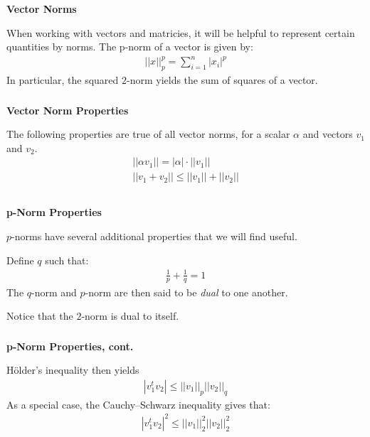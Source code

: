 \begin{frame}[fragile] \frametitle{}

{\bf Vector Norms}

When working with vectors and matricies, it will be helpful
to represent certain quantities by norms. The p-norm of a
vector is given by:
\begin{align*}
||x||_p^p = \sum_{i=1}^n | x_i |^p
\end{align*}
\pause In particular, the squared $2$-norm yields the sum
of squares of a vector.

\end{frame}

\begin{frame}[fragile] \frametitle{}

{\bf Vector Norm Properties}

The following properties are true of all vector norms,
for a scalar $\alpha$ and vectors $v_1$ and $v_2$.
\begin{align*}
|| \alpha v_1 || = |\alpha| \cdot || v_1 || \\
|| v_1 + v_2 || \leq || v_1 || + || v_2 || \\
\end{align*}

\end{frame}

\begin{frame}[fragile] \frametitle{}

{\bf p-Norm Properties}

$p$-norms have several additional properties that we will find
useful.

\pause Define $q$ such that:
\begin{align*}
\frac{1}{p} + \frac{1}{q} = 1
\end{align*}
The $q$-norm and $p$-norm are then said to be {\it dual} to one another.

\pause Notice that the $2$-norm is dual to itself.

\end{frame}

\begin{frame}[fragile] \frametitle{}

{\bf p-Norm Properties, cont.}

Hölder's inequality then yields
\begin{align*}
|v_1^t v_2 | \leq ||v_1||_p ||v_2||_q
\end{align*}
\pause As a special case, the Cauchy–Schwarz inequality
gives that:
\begin{align*}
|v_1^t v_2 |^2 \leq ||v_1||_2^2 ||v_2||_2^2
\end{align*}

\end{frame}


